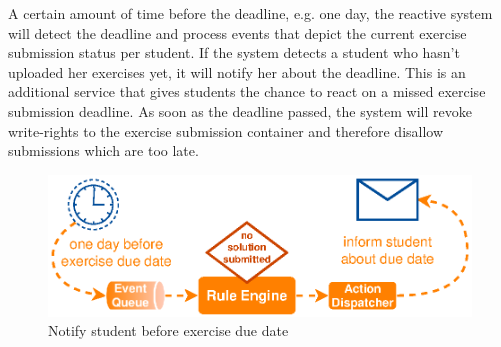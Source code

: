 A certain amount of time before the deadline, e.g. one day, the reactive system will detect the deadline and process events that depict the current exercise submission status per student.
If the system detects a student who hasn't uploaded her exercises yet, it will notify her about the deadline.
This is an additional service that gives students the chance to react on a missed exercise submission deadline.
As soon as the deadline passed, the system will revoke write-rights to the exercise submission container and therefore disallow submissions which are too late.
\begin{figure}[!ht]
  \centering
  \includegraphics{figures/ProBinderExerciseNotification}
  \caption{Notify student before exercise due date}
  \label{fig:ProBinderExerciseNotification}
\end{figure}



